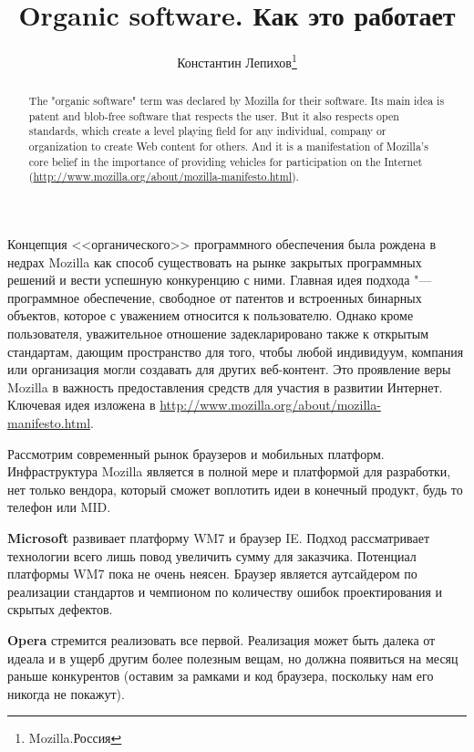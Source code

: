 \documentclass[10pt, a5paper]{article}
\begin{document}
\title{Organic software. Как это работает}
\author{Константин Лепихов\footnote{Mozilla.Россия}}
\date{}
\maketitle

\begin{abstract}
The "organic software" term was declared by Mozilla for their software.
Its main idea is patent and blob-free software that respects the user. But it also
respects open standards, which create a level playing field for any
individual, company or organization to create Web content for others. And it is a
manifestation of Mozilla's core belief in the importance of providing vehicles
for participation on the Internet (\url{http://www.mozilla.org/about/mozilla-manifesto.html}).
\end{abstract}

Концепция <<органического>> программного обеспечения была \linebreak рождена в недрах Mozilla как 
способ существовать на рынке закрытых программных решений и вести успешную
конкуренцию с ними. Главная идея подхода "--- программное обеспечение, свободное от
патентов и встроенных бинарных объектов, которое с уважением относится к пользователю.
Однако кроме пользователя, уважительное отношение задекларировано также к открытым стандартам,
дающим пространство для того, чтобы любой индивидуум, компания или организация могли создавать
для других веб-контент. Это проявление веры Mozilla в важность предоставления средств для
участия в развитии Интернет.
Ключевая идея изложена в \url{http://www.mozilla.org/about/mozilla-manifesto.html}.

Рассмотрим современный рынок браузеров и мобильных платформ. Инфраструктура
Mozilla является в полной мере и платформой для разработки, нет только вендора,
который сможет воплотить идеи в конечный продукт, будь то телефон или MID.

{\bf Microsoft} развивает платформу WM7 и браузер IE. Подход рассматривает 
технологии всего лишь повод увеличить сумму для заказчика. Потенциал платформы WM7 пока 
не очень неясен. Браузер является аутсайдером по реализации стандартов и чемпионом
по количеству ошибок проектирования и скрытых дефектов. 

{\bf Opera} стремится реализовать все первой. Реализация может быть
далека от идеала и в ущерб другим более полезным вещам, но должна появиться на месяц
раньше конкурентов (оставим за рамками и код браузера, поскольку нам
его никогда не покажут).
\end{document}
